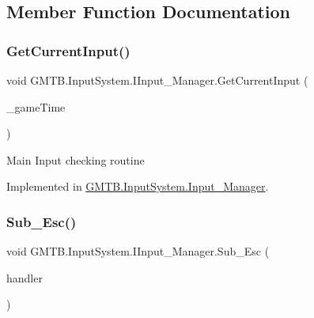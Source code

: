 \subsection{Member Function Documentation}
\mbox{\label{interface_g_m_t_b_1_1_input_system_1_1_i_input___manager_ac18c8364400155f82270785e1c5afd72}} 
\subsubsection{\texorpdfstring{GetCurrentInput()}{GetCurrentInput()}}
{\footnotesize\ttfamily void G\+M\+T\+B.\+Input\+System.\+I\+Input\+\_\+\+Manager.\+Get\+Current\+Input (\begin{DoxyParamCaption}\item[{Game\+Time}]{\+\_\+game\+Time }\end{DoxyParamCaption})}



Main Input checking routine 



Implemented in \mbox{\hyperlink{class_g_m_t_b_1_1_input_system_1_1_input___manager_a19aece0b8405c55cd7c28df0a463899d}{G\+M\+T\+B.\+Input\+System.\+Input\+\_\+\+Manager}}.

\mbox{\label{interface_g_m_t_b_1_1_input_system_1_1_i_input___manager_adf096b62c4736d95efdc9ce6a7f3d219}} 
\subsubsection{\texorpdfstring{Sub\_Esc()}{Sub\_Esc()}}
{\footnotesize\ttfamily void G\+M\+T\+B.\+Input\+System.\+I\+Input\+\_\+\+Manager.\+Sub\+\_\+\+Esc (\begin{DoxyParamCaption}\item[{Event\+Handler$<$ \mbox{\hyperlink{class_g_m_t_b_1_1_input_system_1_1_input_event}{Input\+Event}} $>$}]{handler }\end{DoxyParamCaption})}



